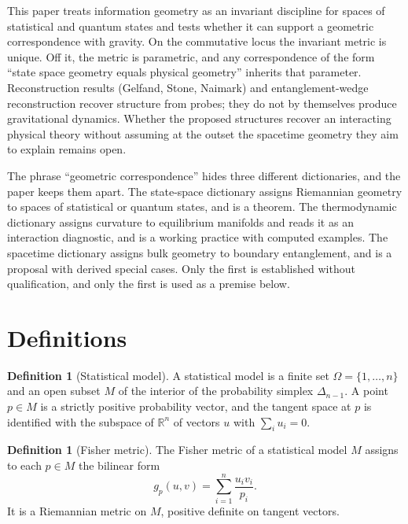 \documentclass[11pt,letterpaper]{article}
\theoremstyle{definition}
\newtheorem{definition}[theorem]{Definition}
\theoremstyle{remark}
\begin{document}
This paper treats information geometry as an invariant discipline for spaces of statistical and quantum states and tests whether it can support a geometric correspondence with gravity. On the commutative locus the invariant metric is unique. Off it, the metric is parametric, and any correspondence of the form ``state space geometry equals physical geometry'' inherits that parameter. Reconstruction results (Gelfand, Stone, Naimark) and entanglement-wedge reconstruction recover structure from probes; they do not by themselves produce gravitational dynamics. Whether the proposed structures recover an interacting physical theory without assuming at the outset the spacetime geometry they aim to explain remains open.

The phrase ``geometric correspondence'' hides three different dictionaries, and the paper keeps them apart. The state-space dictionary assigns Riemannian geometry to spaces of statistical or quantum states, and is a theorem. The thermodynamic dictionary assigns curvature to equilibrium manifolds and reads it as an interaction diagnostic, and is a working practice with computed examples. The spacetime dictionary assigns bulk geometry to boundary entanglement, and is a proposal with derived special cases. Only the first is established without qualification, and only the first is used as a premise below.

\section{Definitions}
\label{sec:definitions}

\begin{definition}[Statistical model]
\label{def:stat-model}
A statistical model is a finite set $\Omega = \{1, \dots, n\}$ and an open subset $M$ of the interior of the probability simplex $\Delta_{n-1}$. A point $p \in M$ is a strictly positive probability vector, and the tangent space at $p$ is identified with the subspace of $\mathbb{R}^n$ of vectors $u$ with $\sum_i u_i = 0$.
\end{definition}

\begin{definition}[Fisher metric]
\label{def:fisher}
The Fisher metric of a statistical model $M$ assigns to each $p \in M$ the bilinear form
\begin{equation}
g_p(u, v) = \sum_{i=1}^{n} \frac{u_i v_i}{p_i}.
\end{equation}
It is a Riemannian metric on $M$, positive definite on tangent vectors.
\end{definition}
\end{document}
